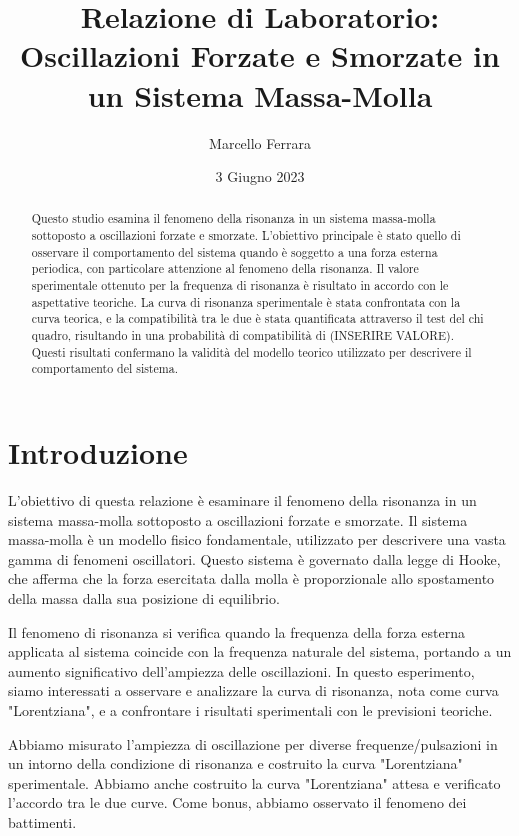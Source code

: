 \documentclass[12pt]{article}
\title{Relazione di Laboratorio: Oscillazioni Forzate e Smorzate in un Sistema Massa-Molla}
\author{Marcello Ferrara}
\date{3 Giugno 2023}
\begin{document}
\maketitle

\begin{abstract}
Questo studio esamina il fenomeno della risonanza in un sistema massa-molla sottoposto
a oscillazioni forzate e smorzate. L'obiettivo principale è stato quello di osservare 
il comportamento del sistema quando è soggetto a una forza esterna periodica, con particolare
attenzione al fenomeno della risonanza. Il valore sperimentale ottenuto per la frequenza
di risonanza è risultato in accordo con le aspettative teoriche. La curva di risonanza
sperimentale è stata confrontata con la curva teorica, e la compatibilità tra le due
è stata quantificata attraverso il test del chi quadro, risultando in una probabilità
di compatibilità di (INSERIRE VALORE). Questi risultati confermano la validità del
modello teorico utilizzato per descrivere il comportamento del sistema.
\end{abstract}

\section{Introduzione}
L'obiettivo di questa relazione è esaminare il fenomeno della risonanza in un sistema 
massa-molla sottoposto a oscillazioni forzate e smorzate. Il sistema massa-molla è un 
modello fisico fondamentale, utilizzato per descrivere una vasta gamma di fenomeni oscillatori.
Questo sistema è governato dalla legge di Hooke, che afferma che la forza esercitata dalla 
molla è proporzionale allo spostamento della massa dalla sua posizione di equilibrio.

Il fenomeno di risonanza si verifica quando la frequenza della forza esterna applicata
al sistema coincide con la frequenza naturale del sistema, portando a un aumento 
significativo dell'ampiezza delle oscillazioni. In questo esperimento, siamo interessati
a osservare e analizzare la curva di risonanza, nota come curva "Lorentziana", e a 
confrontare i risultati sperimentali con le previsioni teoriche.

Abbiamo misurato l'ampiezza di oscillazione per diverse frequenze/pulsazioni in un intorno 
della condizione di risonanza e costruito la curva "Lorentziana" sperimentale. Abbiamo anche 
costruito la curva "Lorentziana" attesa e verificato l'accordo tra le due curve. Come bonus, 
abbiamo osservato il fenomeno dei battimenti.
\end{document}
